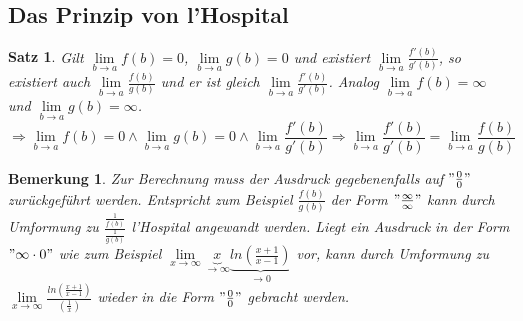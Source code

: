\documentclass[12pt,a4paper]{report}%
\newtheorem{satz}{Satz}[section]
\newtheorem{bem}{Bemerkung}[section]
\numberwithin{equation}{section}
\numberwithin{equation}{subsection}
\begin{document}
  \subsection{Das Prinzip von l'Hospital}
  \begin{satz}
    Gilt $\lim\limits_{b\rightarrow a} f(b) = 0$, $\lim\limits_{b\rightarrow a} g(b) = 0$ und existiert $\lim\limits_{b\rightarrow a} \frac{f'(b)}{g'(b)}$, so existiert auch $\lim\limits_{b\rightarrow a} \frac{f(b)}{g(b)}$ und er ist gleich $\lim\limits_{b\rightarrow a} \frac{f'(b)}{g'(b)}$. Analog $\lim\limits_{b\rightarrow a} f(b) = \infty$ und $\lim\limits_{b\rightarrow a} g(b) = \infty$.
    \begin{equation}
      \Rightarrow \lim\limits_{b\rightarrow a} f(b) = 0 \land \lim\limits_{b\rightarrow a} g(b) = 0 \land \lim\limits_{b\rightarrow a} \frac{f'(b)}{g'(b)} \Rightarrow \lim\limits_{b\rightarrow a} \frac{f'(b)}{g'(b)} = \lim\limits_{b\rightarrow a} \frac{f(b)}{g(b)}
    \end{equation}
  \end{satz}
  \begin{bem}
    Zur Berechnung muss der Ausdruck gegebenenfalls auf $"\frac{0}{0}"$ zurückgeführt werden. Entspricht zum Beispiel $\frac{f(b)}{g(b)}$ der Form $"\frac{\infty}{\infty}"$ kann durch Umformung zu $\frac{\frac{1}{f(b)}}{\frac{1}{g(b)}}$ l'Hospital angewandt werden.\newline
    Liegt ein Ausdruck in der Form $"\infty \cdot 0"$ wie zum Beispiel $\lim\limits_{x\rightarrow \infty} \underbrace{x}_{\rightarrow \infty} \underbrace{ln\left(\frac{x+1}{x-1}\right)}_{\rightarrow 0 }$ vor, kann durch Umformung zu $\lim\limits_{x\rightarrow \infty} \frac{ln\left(\frac{x+1}{x-1}\right)}{\left(\frac{1}{x}\right)}$ wieder in die Form $"\frac{0}{0}"$ gebracht werden.
  \end{bem}
  \newpage
  
\end{document}
